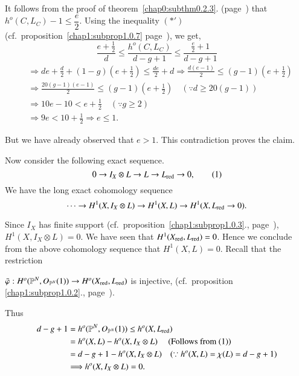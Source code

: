 {It follows from the proof of theorem~\ref{chap0:subthm0.2.3}. 
(page~\pageref{chap0:subthm0.2.3}) that $h^o  
(C, L_C) - 1 \le \dfrac{e}{2}$. Using the inequality $(*')$
(cf.\ proposition~\ref{chap1:subprop1.0.7} 
page~\pageref{chap1:subprop1.0.7}), we get,  
$$
\frac{e + \frac{1}{2}}{d} \le \frac{h^o (C, L_C)}{d - g + 1} \le
\frac{\frac{e}{2} + 1}{ d - g + 1} 
$$
\begin{align*}
& \Longrightarrow de + \frac{d}{2} + (1 - g)(e + \frac{1}{2}) \le
  \frac{de}{2} + d \Longrightarrow \frac{d(e - 1)}{2} \le (g - 1) (e +
  \frac{1}{2})\\ 
& \Longrightarrow \frac{20 (g - 1)(e - 1)}{2} \le (g - 1) (e +
  \frac{1}{2}) \quad (\because d \ge 20 (g - 1))\\ 
& \Longrightarrow 10e - 10 < e + \frac{1}{2} \quad (\because g \ge
  2)\\ 
& \Longrightarrow 9e < 10 + \frac{1}{2} \Longrightarrow e \le 1.
\end{align*}\pageoriginale

But we have already observed that $e > 1$. This contradiction proves
the claim. 

Now consider the following exact sequence.
\begin{equation*}
0 \to I_X \otimes L \to L \to L_{\operatorname{red}} \to 0, \tag{1}\label{c1:eq1}
\end{equation*}
We have the long exact cohomology sequence
$$
\cdots \to H^1 (X, I_X \otimes L) \to H^1 (X, L) \to H^1 (X, L_{\operatorname{red}} \to 0).
$$

\noindent
Since $I_X$ has finite support (cf.\ proposition~\ref{chap1:subprop1.0.3}.,  
page~\pageref{chap1:subprop1.0.3}), 
$H^1 (X, I_X \otimes L) = 0$. We have seen that $H^1 (X_{\operatorname{red}},
L_{\operatorname{red}})=0$. Hence we conclude from the above cohomology sequence that
$H^1 (X, L)=0$. Recall that the restriction 

$\bar{\varphi} : H^o (\mathbb{P}^N, O_{\mathbb{P}^N} (1)) \to H^o
(X_{\operatorname{red}}, L_{\operatorname{red}})$ is injective, (cf.\ proposition \ref{chap1:subprop1.0.2}., 
page~\pageref{chap1:subprop1.0.2}).  

\noindent
Thus
\begin{align*}
d - g + 1 & = h^o (\mathbb{P}^N, O_{\mathbb{P}^N}(1)) \leq h^o(X, L_{\operatorname{red}})\\
& = h^o (X, L) - h^o (X, I_X \otimes L) \quad \text{ (Follows from (1))}\\
& = d - g +1 - h^o (X, I_X \otimes L) \quad (\because h^o (X, L) =
\chi (L) = d - g + 1)\\ 
& \Longrightarrow h^o (X, I_X \otimes L) = 0.
\end{align*}

}
